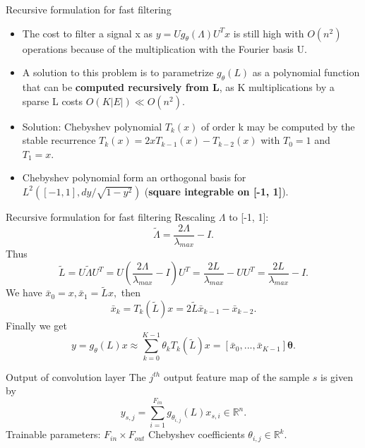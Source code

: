 \documentclass{beamer}
\begin{document}
	\begin{frame}{Recursive formulation for fast filtering}
		\begin{itemize}
			\item The cost to filter a signal x as $y=Ug_\theta(\Lambda)U^Tx$ is still high with $O(n^2)$ operations because of the multiplication with the Fourier basis U.
			\item A solution to this problem is to parametrize $g_\theta(L)$ as a polynomial function that can be \textbf{computed recursively from L}, as K multiplications by a sparse L costs $O(K|E|) \ll O(n^2)$.
			\item Solution: Chebyshev polynomial $T_k(x)$ of order k may be computed by the stable recurrence $T_k(x) = 2xT_{k-1}(x)-T_{k-2}(x)$ with $T_0=1$ and $T_1 = x$.
			\item Chebyshev polynomial form an orthogonal basis for $L^2([−1, 1], dy/\sqrt{1-y^2})$ (\textbf{square integrable on [-1, 1]}).
		\end{itemize}
	\end{frame}
	\begin{frame}{Recursive formulation for fast filtering}
		Rescaling $\Lambda$ to [-1, 1]: \[\tilde{\Lambda} = \frac{2\Lambda}{\lambda_{max}}-I.\]
		Thus
		\[
		\tilde{L} = U\tilde{\Lambda}U^T = U(\frac{2\Lambda}{\lambda_{max}}-I)U^T = \frac{2L}{\lambda_{max}}-UU^T = \frac{2L}{\lambda_{max}}-I.
		\]
		We have $\bar{x}_0 = x, \bar{x}_1 = \tilde{L}x,$ then
		\[
		\bar{x}_k = T_k(\tilde{L})x = 2\tilde{L}\bar{x}_{k-1}-\bar{x}_{k-2}.
		\]
		Finally we get
		\[
		y=g_\theta(L)x \approx \sum_{k=0}^{K-1}\theta_kT_k(\tilde{L})x = [\bar{x}_0, ..., \bar{x}_{K-1}]\mathbf{\theta}.
		\]
 	\end{frame}
 	\begin{frame}{Output of convolution layer}
 		The $j^{th}$ output feature map of the sample $s$ is given by
 		\[
 		y_{s,j}= \sum_{i=1}^{F_{in}}g_{\theta_{i,j}}(L)x_{s,i} \in \mathbb{R}^n.
 		\]
 		Trainable parameters: $F_{in}\times F_{out}$ Chebyshev coefficients $\theta_{i,j} \in \mathbb{R}^k.$
 	\end{frame}
\end{document}
